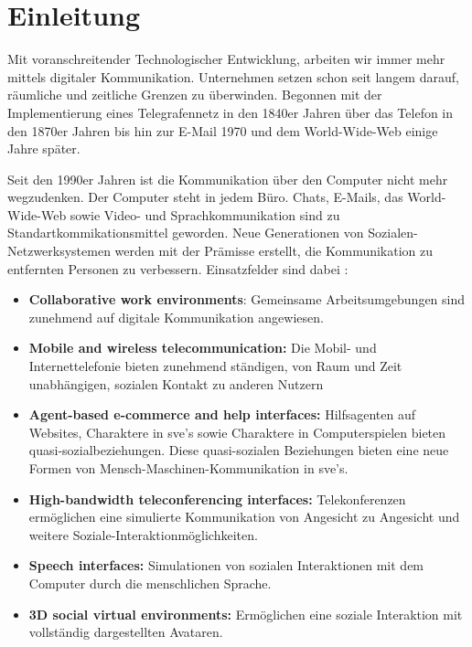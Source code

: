\documentclass[a4paper,11pt]{article}%
\renewcommand{\\}{\vspace*{0.5\baselineskip} \newline}
\begin{document}
	
	\section*{Einleitung}
	Mit voranschreitender Technologischer Entwicklung, arbeiten wir immer mehr mittels digitaler Kommunikation. Unternehmen setzen schon seit langem darauf, räumliche und zeitliche Grenzen zu überwinden. Begonnen mit der Implementierung eines Telegrafennetz in den 1840er Jahren über das Telefon in den 1870er Jahren bis hin zur E-Mail 1970 und dem World-Wide-Web einige Jahre später.
	
	Seit den 1990er Jahren ist die Kommunikation über den Computer nicht mehr wegzudenken. Der Computer steht in jedem Büro. Chats, E-Mails, das World-Wide-Web sowie Video- und Sprachkommunikation sind zu Standartkommikationsmittel geworden. \citep[p. 14-16]{thurlow2004computer} \\ 
Neue Generationen von Sozialen-Netzwerksystemen werden mit der Prämisse erstellt, die Kommunikation zu entfernten Personen zu verbessern.
Einsatzfelder sind dabei :
\begin{itemize}
	\item{\textbf{Collaborative work environments}: Gemeinsame Arbeitsumgebungen sind zunehmend auf digitale Kommunikation angewiesen.}
	\item{\textbf{Mobile and wireless telecommunication:} Die Mobil- und Internettelefonie bieten zunehmend ständigen, von Raum und Zeit unabhängigen, sozialen Kontakt zu anderen Nutzern}
	\item{\textbf{Agent-based e-commerce and help interfaces:} Hilfsagenten auf Websites, Charaktere in \ac{sve}'s sowie Charaktere in Computerspielen bieten \flqq quasi\frqq-sozialbeziehungen. Diese \flqq quasi\frqq-sozialen Beziehungen bieten eine neue Formen von Mensch-Maschinen-Kommunikation in \ac{sve}'s.} 
	\item{\textbf{High-bandwidth teleconferencing interfaces:} Telekonferenzen ermöglichen eine simulierte Kommunikation von Angesicht zu Angesicht und weitere Soziale-Interaktionmöglichkeiten.}
	\item{\textbf{Speech interfaces:} Simulationen von sozialen Interaktionen mit dem Computer durch die menschlichen Sprache.}
	\item{\textbf{3D social virtual environments:} Ermöglichen eine soziale Interaktion mit vollständig dargestellten Avataren.}
\end{itemize}
\end{document}
